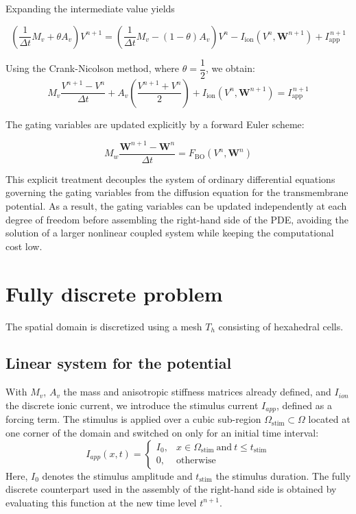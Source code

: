 \documentclass{Configuration_Files/PoliMi3i_thesis}
\begin{document}
Expanding the intermediate value yields

\[
\left(
\frac1{\Delta t}M_v+\theta A_v
\right)
V^{n+1}
=
\left(
\frac1{\Delta t}M_v-(1-\theta)A_v
\right)
V^n
-
I_{\mathrm{ion}}(V^{n},\mathbf W^{n+1})
+
I_{\mathrm{app}}^{\,n+1}
\]

Using the Crank-Nicolson method, where $\theta =\dfrac1 2$, we obtain:
\[
M_v\frac{V^{n+1}-V^n}{\Delta t}
+
A_v\left(\frac{V^{n+1}+V^n}{2}\right)
+
I_{\mathrm{ion}}\!\left(V^n,\mathbf W^{n+1}\right)
=
I_{\mathrm{app}}^{\,n+1}
\]


The gating variables are updated explicitly by a forward Euler scheme:

\[
M_w\frac{\mathbf W^{n+1}-\mathbf W^n}{\Delta t}
=
F_{\mathrm{BO}}(V^n,\mathbf W^n)
\]

This explicit treatment decouples the system of ordinary differential equations
governing the gating variables from the diffusion equation for the transmembrane
potential. As a result, the gating variables can be updated independently at
each degree of freedom before assembling the right-hand side of the PDE, avoiding
the solution of a larger nonlinear coupled system while keeping the computational
cost low.
\newpage
\section{Fully discrete problem}
The spatial domain is discretized using a mesh $T_h$ consisting of hexahedral cells.

\subsection{Linear system for the potential}
With $M_v$, $A_v$ the mass and anisotropic stiffness matrices already
defined, and $I_{ion}$ the discrete ionic current, we
introduce the stimulus current $I_{app}$, defined as a forcing term. The stimulus is applied over a cubic sub-region $\Omega_{\text{stim}} \subset \Omega$ located at one corner of the domain and switched on only for an initial time interval:
\[
I_{app}(x,t) =
\begin{cases}
I_0, & x \in \Omega_{\text{stim}} \ \text{and} \ t \le t_{\text{stim}} \\[4pt]
0, & \text{otherwise}
\end{cases}
\]
Here, $I_0$ denotes the stimulus amplitude and $t_{\text{stim}}$ the stimulus duration. The fully discrete counterpart used in the assembly of the right-hand side is obtained by evaluating this function at the new time level $t^{n+1}$.
\end{document}

